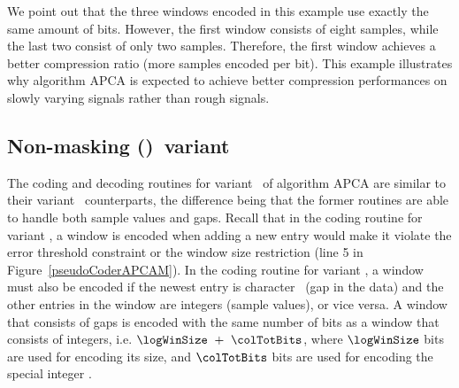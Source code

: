 

We point out that the three windows encoded in this example use exactly the same amount of bits. However, the first window consists of eight samples, while the last two consist of only two samples. Therefore, the first window achieves a better compression ratio (more samples encoded per bit). This example illustrates why algorithm APCA is expected to achieve better compression performances on slowly varying signals rather than rough signals.




\clearpage
\subsection{Non-masking (\NOmaskalgo)\ variant}
\label{algo:apca:nmvariant}


The coding and decoding routines for variant \NOmaskalgo\ of algorithm APCA are similar to their variant \maskalgo\ counterparts, the difference being that the former routines are able to handle both sample values and gaps. Recall that in the coding routine for variant \maskalgo, a window is encoded when adding a new entry would make it violate the error threshold constraint or the window size restriction (line 5 in Figure~\ref{pseudoCoderAPCAM}). In the coding routine for variant \NOmaskalgo, a window must also be encoded if the newest entry is character \noData\ (gap in the data) and the other entries in the window are integers (sample values), or vice versa. A window that consists of gaps is encoded with the same number of bits as a window that consists of integers, i.e. $\logWinSize\ +\ \colTotBits$, where $\logWinSize$ bits are used for encoding its size, and $\colTotBits$ bits are used for encoding the special integer \nodata.

